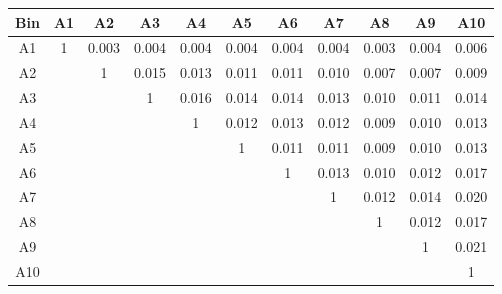\begin{tabular}{c@{~~~}c@{~~}c@{~~}c@{~~}c@{~~}c@{~~}c@{~~}c@{~~}c@{~~}c@{~~}c}
\hline
 \hline
Bin	& A1 & A2 & A3 & A4 & A5 & A6 & A7 & A8 & A9 & A10 \\
\hline
A1	&  1 &  0.003 &  0.004 &  0.004 &  0.004 &  0.004 &  0.004 &  0.003 &  0.004 &  0.006 \\
A2	&   &  1 &  0.015 &  0.013 &  0.011 &  0.011 &  0.010 &  0.007 &  0.007 &  0.009 \\
A3	&   &   &  1 &  0.016 &  0.014 &  0.014 &  0.013 &  0.010 &  0.011 &  0.014 \\
A4	&   &   &   &  1 &  0.012 &  0.013 &  0.012 &  0.009 &  0.010 &  0.013 \\
A5	&   &   &   &   &  1 &  0.011 &  0.011 &  0.009 &  0.010 &  0.013 \\
A6	&   &   &   &   &   &  1 &  0.013 &  0.010 &  0.012 &  0.017 \\
A7	&   &   &   &   &   &   &  1 &  0.012 &  0.014 &  0.020 \\
A8	&   &   &   &   &   &   &   &  1 &  0.012 &  0.017 \\
A9	&   &   &   &   &   &   &   &   &  1 &  0.021 \\
A10	&   &   &   &   &   &   &   &   &   &  1 \\
\hline
 \hline
\end{tabular}
